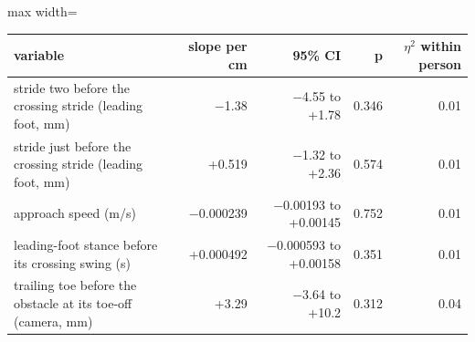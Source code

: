 \begin{adjustbox}{max width=\textwidth}
{\footnotesize
\begin{tabular}{p{6.2cm}rrrr}
\toprule
\textbf{variable} & \textbf{slope per cm} & \textbf{95\% CI} & \textbf{p} & \textbf{$\eta^2$ within person} \\
\midrule
stride two before the crossing stride (leading foot, mm) & $-$1.38 & $-$4.55 to +1.78 & 0.346 & 0.01 \\
stride just before the crossing stride (leading foot, mm) & +0.519 & $-$1.32 to +2.36 & 0.574 & 0.01 \\
approach speed (m/s) & $-$0.000239 & $-$0.00193 to +0.00145 & 0.752 & 0.01 \\
leading-foot stance before its crossing swing (s) & +0.000492 & $-$0.000593 to +0.00158 & 0.351 & 0.01 \\
trailing toe before the obstacle at its toe-off (camera, mm) & +3.29 & $-$3.64 to +10.2 & 0.312 & 0.04 \\
\bottomrule
\end{tabular}
}
\end{adjustbox}
